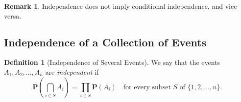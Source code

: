 \documentclass{tufte-handout}
\theoremstyle{definition} \newtheorem{definition}{Definition}
\theoremstyle{definition} \newtheorem{remark}{Remark}
\newcommand{\prob}[1]{\mathbf{P}\left(#1\right)}
\begin{document}
\begin{remark}
  Independence does not imply conditional independence, and vice versa.
\end{remark}

\subsection{Independence of a Collection of Events}
\begin{definition}[Independence of Several Events]
  We say that the events $A_1, A_2, \ldots, A_n$ are \emph{independent} if
  \begin{equation*}
    \prob{\bigcap_{i \in S} A_i} = \prod_{i \in S} \prob{A_i} \quad
    \text{for every subset $S$ of } \{1, 2, \ldots, n\}.
  \end{equation*}
\end{definition}
\end{document}
